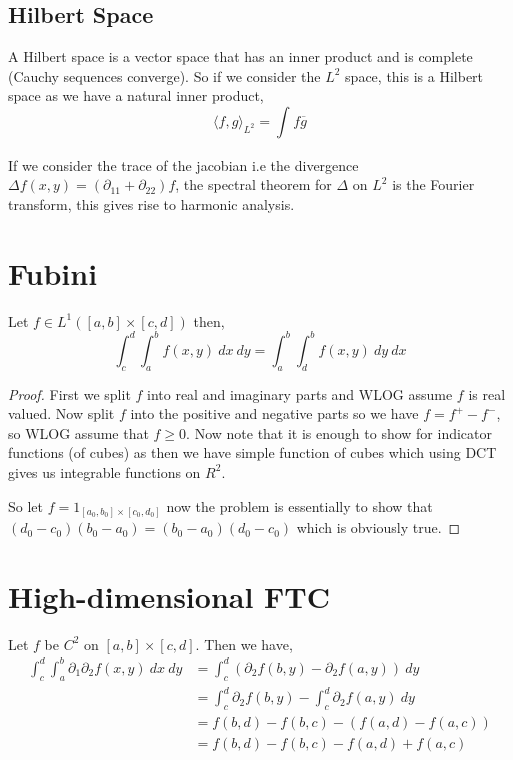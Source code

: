 \subsection*{Hilbert Space}
A Hilbert space is a vector space that has an inner product and is complete (Cauchy sequences converge). So if we consider the $L^2$ space, this is a Hilbert space as we have a natural inner product, 
\[
  \langle f,g \rangle_{L^2} = \int_{}^{} f \overline{g}
\]


If we consider the trace of the jacobian i.e the divergence $\Delta f(x,y) = (\partial_{11} + \partial_{22} ) f$, the spectral theorem for $\Delta$ on $L^2$ is the Fourier transform, this gives rise to harmonic analysis.



\section{Fubini}
\begin{theorem}
  Let $f \in L^{1}([a, b] \times [c, d])$ then, 
  \[
    \int_{c}^{d} \int_{a}^{b}  f(x, y) \ dx \ dy = \int_{a}^{b} \int_{d}^{b} f(x, y) \ dy \ dx
  \]
\end{theorem}
\begin{proof}
  First we split $f$ into real and imaginary parts and WLOG assume $f$ is real valued. Now split $f$ into the positive and negative parts so we have $f = f^{+} - f^{-}$, so WLOG assume that $f \ge 0$. Now note that it is enough to show for indicator functions (of cubes) as then we have simple function of cubes which using DCT gives us integrable functions on $R^2$.

  \vspace{1em}
  
  So let $f = 1_{[a_{0}, b_{0}] \times [c_{0}, d_{0}]}$ now the problem is essentially to show that $(d_{0} - c_{0})(b_{0} - a_{0}) = (b_{0} - a_{0})(d_{0} - c_{0})$ which is obviously true.
\end{proof}
\section{High-dimensional FTC}

Let $f$ be $C^2$ on $[a, b] \times [c, d]$. Then we have, 
\begin{align*}
  \int_{c}^{d} \int_{a}^{b}  \partial_1 \partial_{2} f(x, y) \ dx \ dy &=  \int_{c}^{d}  (\partial_{2} f(b, y) - \partial_{2} f(a, y)) \ dy\\
            &= \int_{c}^{d}  \partial_{2} f(b, y) - \int_{c}^{d} \partial_{2} f(a, y) \ dy\\
            &=  f(b, d) - f(b, c)  - (f(a, d) - f(a, c))\\
            &= f(b, d) - f(b, c) - f(a, d) + f(a, c)
\end{align*}

